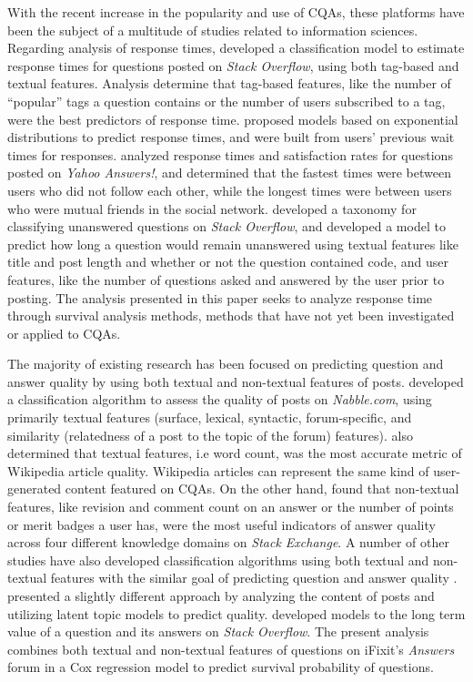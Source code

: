 \documentclass{article}
\begin{document}
With the recent increase in the popularity and use of CQAs, these platforms have been the subject of a multitude of studies related to information sciences. Regarding analysis of response times, \cite{Bhat2014} developed a classification model to estimate response times for questions posted on \textit{Stack Overflow}, using both tag-based and textual features. Analysis determine that tag-based features, like the number of ``popular'' tags a question contains or the number of users subscribed to a tag, were the best predictors of response time. \cite{Mahmud} proposed models based on exponential distributions to predict response times, and were built from users' previous wait times for responses. \cite{Rechavi2011} analyzed response times and satisfaction rates for questions posted on \textit{Yahoo Answers!}, and determined that the fastest times were between users who did not follow each other, while the longest times were between users who were mutual friends in the social network. \cite{Asaduzzaman2013} developed a taxonomy for classifying unanswered questions on \textit{Stack Overflow}, and developed a model to predict how long a question would remain unanswered using textual features like title and post length and whether or not the question contained code, and user features, like the number of questions asked and answered by the user prior to posting. The analysis presented in this paper seeks to analyze response time through survival analysis methods, methods that have not yet been investigated or applied to CQAs.  

The majority of existing research has been focused on predicting question and answer quality by using both textual and non-textual features of posts. \cite{Weimer2007} developed a classification algorithm to assess the quality of posts on \textit{Nabble.com}, using primarily textual features (surface, lexical, syntactic, forum-specific, and similarity (relatedness of a post to the topic of the forum) features). \cite{Blumenstock} also determined that textual features, i.e word count, was the most accurate metric of Wikipedia article quality. Wikipedia articles can represent the same kind of user-generated content featured on CQAs. On the other hand, \cite{H.fu} found that non-textual features, like revision and comment count on an answer or the number of points or merit badges a user has, were the most useful indicators of answer quality across four different knowledge domains on \textit{Stack Exchange}. A number of other studies have also developed classification algorithms using both textual and non-textual features with the similar goal of predicting question and answer quality \cite{Yao2015} \cite{Toba2014} \cite{Ponzanelli2014a}. \cite{Ravi2014} presented a slightly different approach by analyzing the content of posts and utilizing latent topic models to predict quality. \cite{Anderson2012} developed models to the long term value of a question and its answers on \textit{Stack Overflow}. The present analysis combines both textual and non-textual features of questions on iFixit's \textit{Answers} forum in a Cox regression model to predict survival probability of questions.
\end{document}
